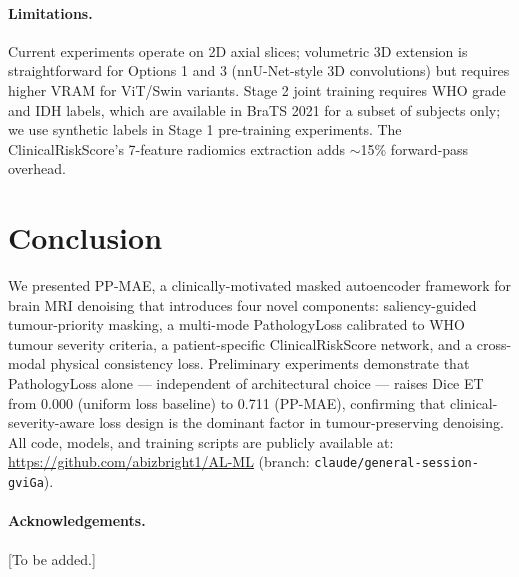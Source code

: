 \documentclass[runningheads]{llncs}
\begin{document}
\paragraph{Limitations.}
Current experiments operate on 2D axial slices; volumetric 3D extension
is straightforward for Options 1 and 3 (nnU-Net-style 3D convolutions)
but requires higher VRAM for ViT/Swin variants.
Stage 2 joint training requires WHO grade and IDH labels, which are
available in BraTS 2021 for a subset of subjects only; we use synthetic
labels in Stage 1 pre-training experiments.
The ClinicalRiskScore's 7-feature radiomics extraction adds $\sim$15\%
forward-pass overhead.


\section{Conclusion}
\label{sec:conclusion}

We presented PP-MAE, a clinically-motivated masked autoencoder framework
for brain MRI denoising that introduces four novel components:
saliency-guided tumour-priority masking, a multi-mode PathologyLoss
calibrated to WHO tumour severity criteria, a patient-specific
ClinicalRiskScore network, and a cross-modal physical consistency loss.
Preliminary experiments demonstrate that PathologyLoss alone — independent
of architectural choice — raises Dice ET from 0.000 (uniform loss baseline)
to 0.711 (PP-MAE), confirming that clinical-severity-aware loss design
is the dominant factor in tumour-preserving denoising.
All code, models, and training scripts are publicly available at:
\url{https://github.com/abizbright1/AL-ML} (branch: \texttt{claude/general-session-gviGa}).

\paragraph{Acknowledgements.} [To be added.]

\end{document}
